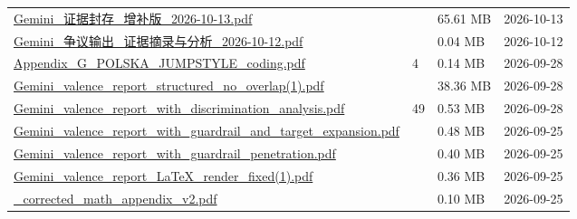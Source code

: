 \documentclass[UTF8,fontset=fandol,10pt,a4paper]{ctexart}
\begin{document}
\begin{longtable}{@{}L{\dimexpr\linewidth-50mm-6\tabcolsep\relax}R{8mm}R{16mm}R{26mm}@{}}
\href{https://chatgpt.com/library?file_id=libfile_a31ba7a636b08191b827736c65d6716e&account_id=personal}{Gemini\_\allowbreak{}证据封存\_\allowbreak{}增补版\_\allowbreak{}2026-\allowbreak{}10-\allowbreak{}13.\allowbreak{}pdf} & \textemdash{} & 65.61 MB & 2026-10-13 \\
\href{https://chatgpt.com/library?file_id=libfile_ba7c95aba4c4819188d7eca05e2e857f&account_id=personal}{Gemini\_\allowbreak{}争议输出\_\allowbreak{}证据摘录与分析\_\allowbreak{}2026-\allowbreak{}10-\allowbreak{}12.\allowbreak{}pdf} & \textemdash{} & 0.04 MB & 2026-10-12 \\
\href{https://chatgpt.com/library?file_id=libfile_9fc543223a388191a88eb435fdf4edf6&account_id=personal}{Appendix\_\allowbreak{}G\_\allowbreak{}POLSKA\_\allowbreak{}JUMPSTYLE\_\allowbreak{}coding.\allowbreak{}pdf} & 4 & 0.14 MB & 2026-09-28 \\
\href{https://chatgpt.com/library?file_id=libfile_efd9478990048191aa3f967a351f9c35&account_id=personal}{Gemini\_\allowbreak{}valence\_\allowbreak{}report\_\allowbreak{}structured\_\allowbreak{}no\_\allowbreak{}overlap(1).\allowbreak{}pdf} & \textemdash{} & 38.36 MB & 2026-09-28 \\
\href{https://chatgpt.com/library?file_id=libfile_83e14d838ee481919e56e5b5c7f890dc&account_id=personal}{Gemini\_\allowbreak{}valence\_\allowbreak{}report\_\allowbreak{}with\_\allowbreak{}discrimination\_\allowbreak{}analysis.\allowbreak{}pdf} & 49 & 0.53 MB & 2026-09-28 \\
\href{https://chatgpt.com/library?file_id=libfile_d57fa2d2a01c8191a856bde476e387ed&account_id=personal}{Gemini\_\allowbreak{}valence\_\allowbreak{}report\_\allowbreak{}with\_\allowbreak{}guardrail\_\allowbreak{}and\_\allowbreak{}target\_\allowbreak{}expansion.\allowbreak{}pdf} & \textemdash{} & 0.48 MB & 2026-09-25 \\
\href{https://chatgpt.com/library?file_id=libfile_33bdf817f19481919bfbd01e99b9ade5&account_id=personal}{Gemini\_\allowbreak{}valence\_\allowbreak{}report\_\allowbreak{}with\_\allowbreak{}guardrail\_\allowbreak{}penetration.\allowbreak{}pdf} & \textemdash{} & 0.40 MB & 2026-09-25 \\
\href{https://chatgpt.com/library?file_id=libfile_94c3dd644f908191bc2f922ca519fdb2&account_id=personal}{Gemini\_\allowbreak{}valence\_\allowbreak{}report\_\allowbreak{}LaTeX\_\allowbreak{}render\_\allowbreak{}fixed(1).\allowbreak{}pdf} & \textemdash{} & 0.36 MB & 2026-09-25 \\
\href{https://chatgpt.com/library?file_id=libfile_d37bdd3427fc81919ed2b368c6741167&account_id=personal}{\_\allowbreak{}corrected\_\allowbreak{}math\_\allowbreak{}appendix\_\allowbreak{}v2.\allowbreak{}pdf} & \textemdash{} & 0.10 MB & 2026-09-25 \\

\end{longtable}
\end{document}
